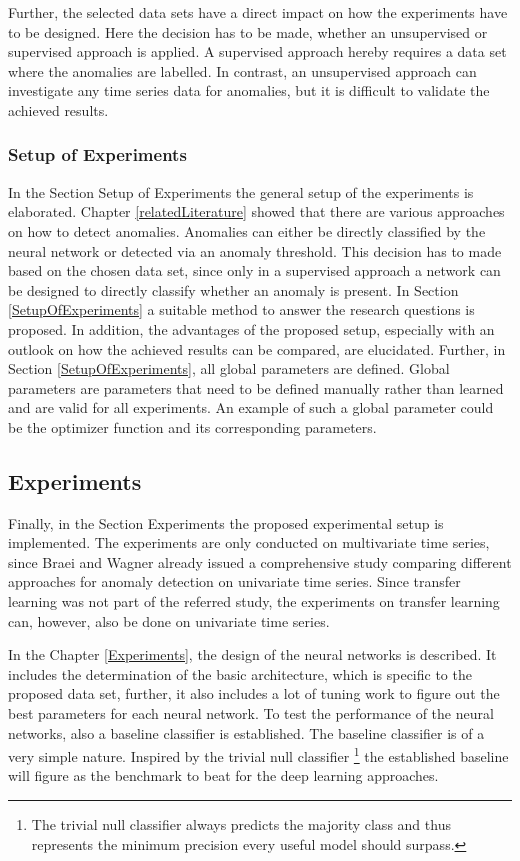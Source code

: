 Further, the selected data sets have a direct impact on how the experiments have to be designed. Here the decision has to be made, whether an unsupervised or supervised approach is applied. A supervised approach hereby requires a data set where the anomalies are labelled. In contrast, an unsupervised approach can investigate any time series data for anomalies, but it is difficult to validate the achieved results.

\subsubsection{Setup of Experiments}
In the Section Setup of Experiments the general setup of the experiments is elaborated. Chapter \ref{relatedLiterature} showed that there are various approaches on how to detect anomalies. Anomalies can either be directly classified by the neural network or detected via an anomaly threshold. This decision has to made based on the chosen data set, since only in a supervised approach a network can be designed to directly classify whether an anomaly is present. In Section \ref{SetupOfExperiments} a suitable method to answer the research questions is proposed. In addition, the advantages of the proposed setup, especially with an outlook on how the achieved results can be compared, are elucidated.   
Further, in Section \ref{SetupOfExperiments}, all global parameters are defined. Global parameters are parameters that need to be defined manually rather than learned and are valid for all experiments. An example of such a global parameter could be the optimizer function and its corresponding parameters.

\subsection{Experiments}
Finally, in the Section Experiments the proposed experimental setup is implemented. The experiments are only conducted on multivariate time series, since Braei and Wagner \parencite*{Braei2020} already issued a comprehensive study comparing different approaches for anomaly detection on univariate time series. Since transfer learning was not part of the referred study, the experiments on transfer learning can, however, also be done on univariate time series. 

In the Chapter \ref{Experiments}, the design of the neural networks is described. It includes the determination of the basic architecture, which is specific to the proposed data set, further, it also includes a lot of tuning work to figure out the best parameters for each neural network. To test the performance of the neural networks, also a baseline classifier is established. The baseline classifier is of a very simple nature. Inspired by the trivial null classifier \footnote{The trivial null classifier always predicts the majority class and thus represents the minimum precision every useful model should surpass.} the established baseline will figure as the benchmark to beat for the deep learning approaches. 

